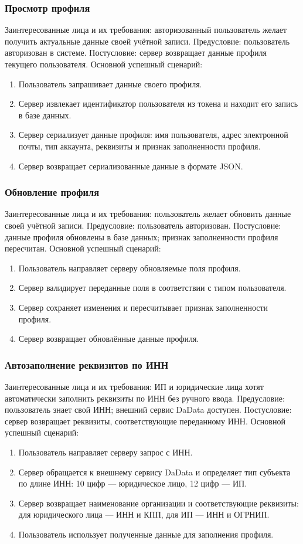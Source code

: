 \subsubsection{Просмотр профиля}
Заинтересованные лица и их требования: авторизованный пользователь желает получить актуальные данные своей учётной записи.
Предусловие: пользователь авторизован в системе.
Постусловие: сервер возвращает данные профиля текущего пользователя.
Основной успешный сценарий:
\begin{enumerate}
\item Пользователь запрашивает данные своего профиля.
\item Сервер извлекает идентификатор пользователя из токена и находит его запись в базе данных.
\item Сервер сериализует данные профиля: имя пользователя, адрес электронной почты, тип аккаунта, реквизиты и признак заполненности профиля.
\item Сервер возвращает сериализованные данные в формате JSON.
\end{enumerate}

\subsubsection{Обновление профиля}
Заинтересованные лица и их требования: пользователь желает обновить данные своей учётной записи.
Предусловие: пользователь авторизован.
Постусловие: данные профиля обновлены в базе данных; признак заполненности профиля пересчитан.
Основной успешный сценарий:
\begin{enumerate}
\item Пользователь направляет серверу обновляемые поля профиля.
\item Сервер валидирует переданные поля в соответствии с типом пользователя.
\item Сервер сохраняет изменения и пересчитывает признак заполненности профиля.
\item Сервер возвращает обновлённые данные профиля.
\end{enumerate}

\subsubsection{Автозаполнение реквизитов по ИНН}
Заинтересованные лица и их требования: ИП и юридические лица хотят автоматически заполнить реквизиты по ИНН без ручного ввода.
Предусловие: пользователь знает свой ИНН; внешний сервис DaData доступен.
Постусловие: сервер возвращает реквизиты, соответствующие переданному ИНН.
Основной успешный сценарий:
\begin{enumerate}
\item Пользователь направляет серверу запрос с ИНН.
\item Сервер обращается к внешнему сервису DaData и определяет тип субъекта по длине ИНН: 10 цифр — юридическое лицо, 12 цифр — ИП.
\item Сервер возвращает наименование организации и соответствующие реквизиты: для юридического лица — ИНН и КПП, для ИП — ИНН и ОГРНИП.
\item Пользователь использует полученные данные для заполнения профиля.
\end{enumerate}

